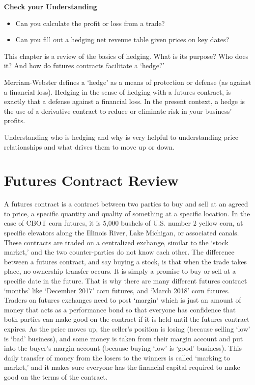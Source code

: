 \documentclass[
]{book}
\providecommand{\tightlist}{%
  \setlength{\itemsep}{0pt}\setlength{\parskip}{0pt}}
\begin{document}
\textbf{Check your Understanding}

\begin{itemize}
\tightlist
\item
  Can you calculate the profit or loss from a trade?
\item
  Can you fill out a hedging net revenue table given prices on key dates?
\end{itemize}

This chapter is a review of the basics of hedging. What is its purpose? Who does it? And how do futures contracts facilitate a `hedge?'

Merriam-Webster defines a `hedge' as a means of protection or defense (as against a financial loss). Hedging in the sense of hedging with a futures contract, is exactly that a defense against a financial loss. In the present context, a hedge is the use of a derivative contract to reduce or eliminate risk in your business' profits.

Understanding who is hedging and why is very helpful to understanding price relationships and what drives them to move up or down.

\hypertarget{futures-contract-review}{%
\section{Futures Contract Review}\label{futures-contract-review}}

A futures contract is a contract between two parties to buy and sell at an agreed to price, a specific quantity and quality of something at a specific location. In the case of CBOT corn futures, it is 5,000 bushels of U.S. number 2 yellow corn, at specific elevators along the Illinois River, Lake Michigan, or associated canals. These contracts are traded on a centralized exchange, similar to the `stock market,' and the two counter-parties do not know each other. The difference between a futures contract, and say buying a stock, is that when the trade takes place, no ownership transfer occurs. It is simply a promise to buy or sell at a specific date in the future. That is why there are many different futures contract `months' like `December 2017' corn futures, and `March 2018' corn futures. Traders on futures exchanges need to post `margin' which is just an amount of money that acts as a performance bond so that everyone has confidence that both parties can make good on the contract if it is held until the futures contract expires. As the price moves up, the seller's position is losing (because selling `low' is `bad' business), and some money is taken from their margin account and put into the buyer's margin account (because buying `low' is `good' business). This daily transfer of money from the losers to the winners is called `marking to market,' and it makes sure everyone has the financial capital required to make good on the terms of the contract.
\end{document}
